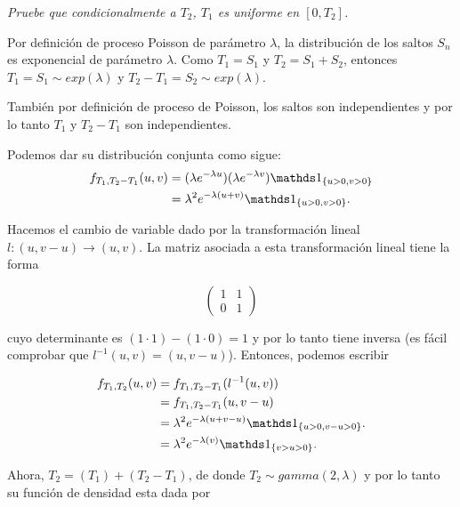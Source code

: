\emph{
	Pruebe que condicionalmente a $T_2$, $T_1$ es uniforme en $[0,T_2]$.
}

\afterstatement\pn

Por definición de proceso Poisson de parámetro $\lambda$, la distribución de los saltos $S_n$ es
exponencial de parámetro $\lambda$. Como $T_1 = S_1$ y $T_2 = S_1 + S_2$, entonces
$T_1  = S_1 \sim exp(\lambda) $ y  $T_2 - T_1 = S_2 \sim exp(\lambda)$.\pn

También por definición de proceso de Poisson, los saltos son independientes y por lo tanto
$T_1$ y $T_2 - T_1$ son independientes.\pn

Podemos dar su distribución conjunta como sigue:
\begin{align}
    f_{T_1, T_2 - T_1}(u, v)    &=  (\lambda e^{-\lambda u}) (\lambda e^{-\lambda v}) \indic_{\{ u > 0, v > 0 \}}   \\
                                &=  \lambda^2 e^{-\lambda (u + v)} \indic_{\{ u > 0, v > 0 \}}.
\end{align}

Hacemos el cambio de variable dado por la transformación lineal $l : (u, v-u) \longrightarrow (u, v)$.
La matriz asociada a esta transformación lineal tiene la forma

\[
    \left(
            \begin{array}{cc}
                    1   &   1   \\
                    0   &   1   \end{array}
    \right)
\]

cuyo determinante es $(1 \cdot 1) - (1 \cdot 0) = 1$ y por lo tanto tiene inversa (es fácil comprobar que $l^{-1}(u,v) = (u, v - u)$). 
Entonces, podemos escribir

\begin{align}
    f_{T_1, T_2}(u, v)      &=    f_{T_1, T_2 - T_1}(l^{-1}(u, v))                                      \\
                            &=    f_{T_1, T_2 - T_1}(u, v - u)                                          \\
                            &=    \lambda^2 e^{-\lambda (u + v - u)} \indic_{\{ u > 0, v - u > 0 \}}.   \\
                            &=    \lambda^2 e^{-\lambda (v)} \indic_{\{ v > u > 0 \}}.                    
\end{align}\pn

Ahora, $T_2 = (T_1) + (T_2 - T_1)$, de donde $T_2 \sim gamma(2, \lambda)$ y por lo tanto su función de densidad esta dada por


